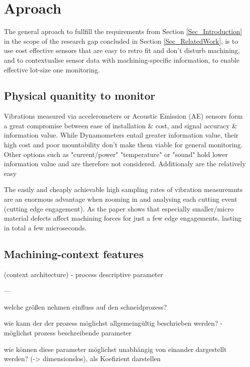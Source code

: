 \documentclass[5p,times,procedia]{elsarticle}
\begin{document}
\section{Aproach}\label{Sec_Aproach}
The general aproach to fullfill the requirements from Section \ref{Sec_Introduction} in the scope of the research gap concluded in Section \ref{Sec_RelatedWork}, is to use cost effective sensors that are easy to retro fit and don't disturb machining, and to contextualise sensor data with machining-specific information, to enable effective lot-size one monitoring.


\subsection{Physical quanitity to monitor}
\vspace*{-\baselineskip}
Vibrations measured via accelerometers or Acoustic Emission (AE) sensors form a great compromise between ease of installation \& cost, and signal accuracy \& information value. While Dynamometers entail greater information value, their high cost and poor mountability don't make them viable for general monitoring. Other options such as "current/power" "temperature" or "sound" hold lower information value and are therefore not considered.
Additionaly are the relatively easy 

The easily and cheaply achievable high sampling rates of vibration measuremnts are an enormous advantage when zooming in and analysing each cutting event (cutting edge engagement). As the paper \cite{Pfirrmann.Baumann.ea2021} shows that especially smaller/micro material defects affect machining forces for just a few edge engagements, lasting in total a few microseconds.


\subsection{Machining-context features}
\vspace*{-\baselineskip}
(context architecture)
- process descriptive parameter


---

welche größen nehmen einfluss auf den schneidprozess?

wie kann der der prozess möglichst allgemeingültig beschrieben werden? -möglichst prozess beschreibende parameter

wie können diese parameter möglichst unabhängig von einander dargestellt werden? (-> dimensionslos), als Koefizient darstellen
\end{document}
